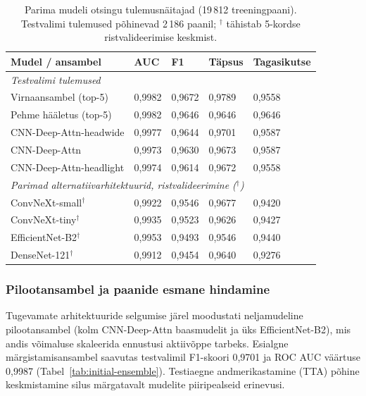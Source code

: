 \begin{table}[h!]
\centering
\caption{Parima mudeli otsingu tulemusnäitajad (19\,812 treeningpaani). Testvalimi tulemused põhinevad 2\,186 paanil; ${}^{\dagger}$ tähistab 5-kordse ristvalideerimise keskmist.}
\label{tab:model-search-v1}
\begin{tabular}{lllll}
\hline
\textbf{Mudel / ansambel} & \textbf{AUC} & \textbf{F1} & \textbf{Täpsus} & \textbf{Tagasikutse} \\
\hline
\multicolumn{5}{l}{\textit{Testvalimi tulemused}} \\
\hline
Virnaansambel (top-5)       & 0,9982 & 0,9672 & 0,9789 & 0,9558 \\
Pehme hääletus (top-5)      & 0,9982 & 0,9646 & 0,9646 & 0,9646 \\
CNN-Deep-Attn-headwide      & 0,9977 & 0,9644 & 0,9701 & 0,9587 \\
CNN-Deep-Attn               & 0,9973 & 0,9630 & 0,9673 & 0,9587 \\
CNN-Deep-Attn-headlight     & 0,9974 & 0,9614 & 0,9672 & 0,9558 \\
\hline
\multicolumn{5}{l}{\textit{Parimad alternatiivarhitektuurid, ristvalideerimine (${}^{\dagger}$)}} \\
\hline
ConvNeXt-small${}^{\dagger}$  & 0,9922 & 0,9546 & 0,9677 & 0,9420 \\
ConvNeXt-tiny${}^{\dagger}$   & 0,9935 & 0,9523 & 0,9626 & 0,9427 \\
EfficientNet-B2${}^{\dagger}$ & 0,9953 & 0,9493 & 0,9546 & 0,9440 \\
DenseNet-121${}^{\dagger}$    & 0,9912 & 0,9454 & 0,9640 & 0,9276 \\
\hline
\end{tabular}
\end{table}

\subsubsection{Pilootansambel ja paanide esmane hindamine}
\label{esialgse-ansambli-tulemused}

Tugevamate arhitektuuride selgumise järel moodustati neljamudeline pilootansambel (kolm \mbox{CNN-Deep-Attn} baasmudelit ja üks EfficientNet-B2), mis andis võimaluse skaleerida ennustusi aktiivõppe tarbeks. Esialgne märgistamisansambel saavutas testvalimil F1-skoori 0,9701 ja ROC AUC väärtuse 0,9987 (Tabel~\ref{tab:initial-ensemble}). Testiaegne andmerikastamine (TTA) põhine keskmistamine silus märgatavalt mudelite piiripealseid erinevusi.

